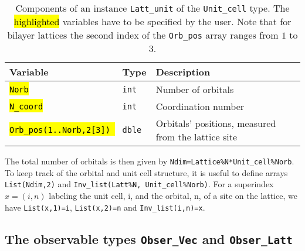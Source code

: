 
\begin{table}[h!]
	\begin{center}
   \begin{tabular}{@{} l l l @{}}\toprule
    Variable                              & Type          & Description \\\midrule
    \hl{\texttt{Norb}}                    & \texttt{int}  & Number of orbitals \\
    \hl{\texttt{N\_coord}}                & \texttt{int}  & Coordination number \\
    \hl{\texttt{Orb\_pos(1..Norb,2[3]) }} & \texttt{dble} & Orbitals' positions, measured from the lattice site  \\\bottomrule
   \end{tabular}
     \caption{Components of an instance \texttt{Latt\_unit} of the \texttt{Unit\_cell} type.
   The \hl{highlighted} variables have to be specified by the user. Note that for bilayer lattices the second index of the \texttt{Orb\_pos} array  ranges from $1$ to $3$.  } 
    \label{table:unit_cell}
\end{center}
\end{table}

The total  number of orbitals  is then given by \texttt{Ndim=Lattice\%N*Unit\_cell\%Norb}.  To keep track of the orbital and  unit cell structure, it is useful to define arrays 
\texttt{List(Ndim,2)}  and \texttt{Inv\_list(Latt\%N, Unit\_cell\%Norb)}.  For a superindex $x = (i,n)$ labeling the unit cell, i,  and the orbital, n, of a site on the lattice, we have 
\texttt{List(x,1)=i}, \texttt{List(x,2)=n}  and \texttt{Inv\_list(i,n)=x}. 


\subsection{The observable types \texttt{Obser\_Vec} and \texttt{Obser\_Latt}}\label{sec:obs}


